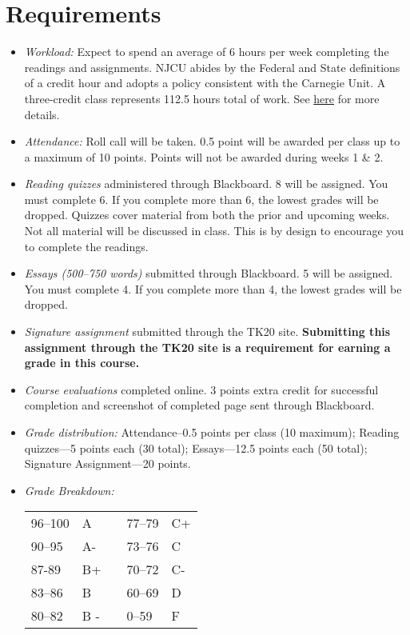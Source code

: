 \documentclass[article,oneside]{memoir}
\begin{document}
\section{Requirements}



\begin{itemize}
\item \textit{Workload:} Expect to spend an average of 6 hours per week completing the readings and assignments. NJCU abides by the Federal and State definitions of a credit hour and adopts a policy consistent with the Carnegie Unit. A three-credit class represents 112.5 hours total of work. See \href{http://scoconno.github.io/Teaching/Credit.pdf}{here} for more details.

\item \textit{Attendance:} Roll call will be taken. 0.5 point will be awarded per class up to a maximum of 10 points. Points will not be awarded during weeks 1 \& 2. 

\item \textit{Reading quizzes} administered through Blackboard. 8  will be assigned. You must complete 6. If you complete more than 6, the lowest grades will be dropped. Quizzes cover material from both the prior and upcoming weeks. Not all material will be discussed in class. This is by design to encourage you to complete the readings. 


\item \textit{Essays (500--750 words)} submitted through Blackboard.  5 will be assigned. You must complete 4. If you complete more than 4, the lowest grades will be dropped. 

\item \textit{Signature assignment} submitted through the TK20 site. \textbf{Submitting this assignment through the TK20 site is a requirement for earning a grade in this course.}

\item \textit{Course evaluations} completed online. 3 points extra credit for successful completion and screenshot of completed page sent through Blackboard. 
  
\item \textit{Grade distribution:} Attendance--0.5 points per class (10 maximum); Reading quizzes---5 points each (30 total);  Essays---12.5 points each (50 total); Signature Assignment---20 points.


\item \textit{Grade Breakdown:}

 \begin{tabular}{ | l | l | p{2cm} | l | l | }
    \hline 
96--100 & A  & &  77--79 &  C+ \\  
90--95 & A- & &  73--76 & C \\
87-89 & B+ &  &  70--72 & C- \\ 
83--86 & B  & &  60--69 & D\\
80--82 & B - & & 0--59 & F\\ \hline
    \end{tabular}


\end{itemize}
\end{document}
